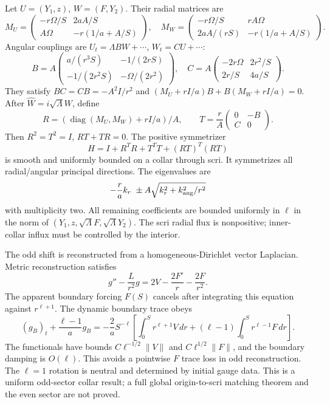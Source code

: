 \documentclass[11pt]{article}
\begin{document}
Let $U=(Y_1,z)$, $W=(F,Y_2)$. Their radial matrices are
\[
M_U=\begin{pmatrix}-r\Omega/S&2aA/S\\ A\Omega&-r(1/a+A/S)\end{pmatrix},
\quad
M_W=\begin{pmatrix}-r\Omega/S&rA\Omega\\
2aA/(rS)&-r(1/a+A/S)\end{pmatrix}.
\]
Angular couplings are $U_t=\Lambda BW+\cdots$, $W_t=CU+\cdots$:
\[
B=A\begin{pmatrix}a/(r^3S)&-1/(2rS)\\
-1/(2r^2S)&-\Omega/(2r^2)\end{pmatrix},\quad
C=A\begin{pmatrix}-2r\Omega&2r^2/S\\2r/S&4a/S\end{pmatrix}.
\]
They satisfy $BC=CB=-A^2I/r^2$ and
$(M_U+rI/a)B+B(M_W+rI/a)=0$.
After $\widehat W=i\sqrt{\Lambda}W$, define
\[
R=(\operatorname{diag}(M_U,M_W)+rI/a)/A,\qquad
T=\frac rA\begin{pmatrix}0&-B\\ C&0\end{pmatrix}.
\]
Then $R^2=T^2=I$, $RT+TR=0$. The positive symmetrizer
\[
H=I+R^TR+T^TT+(RT)^T(RT)
\]
is smooth and uniformly bounded on a collar through scri. It symmetrizes
all radial/angular principal directions. The eigenvalues are
\[
-\frac ra k_r\ \pm A\sqrt{k_r^2+k_{\rm ang}^2/r^2}
\]
with multiplicity two. All remaining coefficients are bounded uniformly
in $\ell$ in the norm of
$(Y_1,z,\sqrt\Lambda F,\sqrt\Lambda Y_2)$. The scri radial flux is
nonpositive; inner-collar influx must be controlled by the interior.

The odd shift is reconstructed from a homogeneous-Dirichlet vector
Laplacian. Metric reconstruction satisfies
\[
g''-\frac{L}{r^2}g=2V-\frac{2F'}r-\frac{2F}{r^2}.
\]
The apparent boundary forcing $F(S)$ cancels after integrating this
equation against $r^{\ell+1}$. The dynamic boundary trace obeys
\[
(g_B)_t+\frac{\ell-1}{a}g_B
=-\frac2a S^{-\ell}
\left[\int_0^S r^{\ell+1}V\,dr+
(\ell-1)\int_0^S r^{\ell-1}F\,dr\right].
\]
The functionals have bounds $C\ell^{-1/2}\|V\|$ and
$C\ell^{1/2}\|F\|$, and the boundary damping is $O(\ell)$.
This avoids a pointwise $F$ trace loss in odd reconstruction.
The $\ell=1$ rotation is neutral and determined by initial gauge data.
This is a uniform odd-sector collar result; a full global
origin-to-scri matching theorem and the even sector are not proved.
\end{document}
